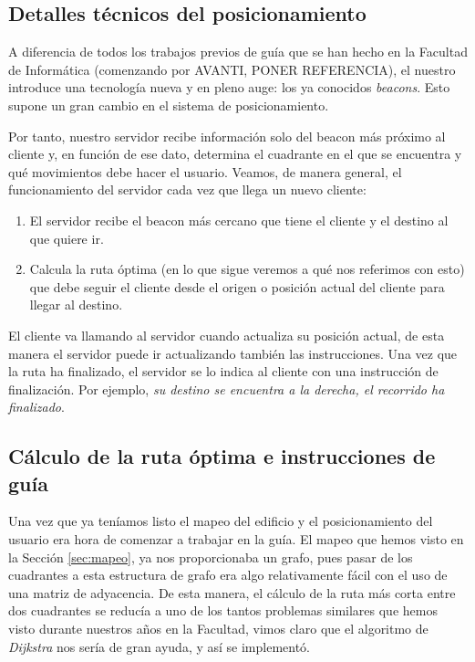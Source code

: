 \subsection{Detalles técnicos del posicionamiento}

A diferencia de todos los trabajos previos de guía que se han hecho en la Facultad de Informática (comenzando por AVANTI, PONER REFERENCIA), el nuestro introduce una tecnología nueva y en pleno auge: los ya conocidos \textit{beacons}. Esto supone un gran cambio en el sistema de posicionamiento.

Por tanto, nuestro servidor recibe información solo del beacon más próximo al cliente y, en función de ese dato, determina el cuadrante en el que se encuentra y qué movimientos debe hacer el usuario.  Veamos, de manera general, el funcionamiento del servidor cada vez que llega un nuevo cliente:

\begin{enumerate}
	\item El servidor recibe el beacon más cercano que tiene el cliente y el destino al que quiere ir.
	
	\item Calcula la ruta óptima (en lo que sigue veremos a qué nos referimos con esto) que debe seguir el cliente desde el origen o posición actual del cliente para llegar al destino. 
\end{enumerate}

El cliente va llamando al servidor cuando actualiza su posición actual, de esta manera el servidor puede ir actualizando también las instrucciones. Una vez que la ruta ha finalizado, el servidor se lo indica al cliente con una instrucción de finalización. Por ejemplo, \textit{su destino se encuentra a la derecha, el recorrido ha finalizado}.

\subsection{Cálculo de la ruta óptima e instrucciones de guía}

Una vez que ya teníamos listo el mapeo del edificio y el posicionamiento del usuario era hora de comenzar a trabajar en la guía. El mapeo que hemos visto en la Sección \ref{sec:mapeo}, ya nos proporcionaba un grafo, pues pasar de los cuadrantes a esta estructura de grafo era algo relativamente fácil con el uso de una matriz de adyacencia. De esta manera, el cálculo de la ruta más corta entre dos cuadrantes se reducía a uno de los tantos problemas similares que hemos visto durante nuestros años en la Facultad, vimos claro que el algoritmo de \textit{ Dijkstra} nos sería de gran ayuda, y así se implementó.

